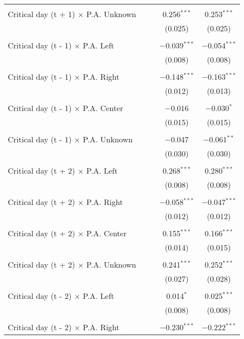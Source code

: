 \documentclass[
]{article}
\begin{document}
\begin{table}[!htbp]
{\begin{tabular}{@{\extracolsep{5pt}}lcccc}
  & & & & \\ 
 Critical day (t + 1) $\times$ P.A. Unknown &  &  & 0.256$^{***}$ & 0.253$^{***}$ \\ 
  &  &  & (0.025) & (0.025) \\ 
  & & & & \\ 
 Critical day (t - 1) $\times$ P.A. Left &  &  & $-$0.039$^{***}$ & $-$0.054$^{***}$ \\ 
  &  &  & (0.008) & (0.008) \\ 
  & & & & \\ 
 Critical day (t - 1) $\times$ P.A. Right &  &  & $-$0.148$^{***}$ & $-$0.163$^{***}$ \\ 
  &  &  & (0.012) & (0.013) \\ 
  & & & & \\ 
 Critical day (t - 1) $\times$ P.A. Center &  &  & $-$0.016 & $-$0.030$^{*}$ \\ 
  &  &  & (0.015) & (0.015) \\ 
  & & & & \\ 
 Critical day (t - 1) $\times$ P.A. Unknown &  &  & $-$0.047 & $-$0.061$^{**}$ \\ 
  &  &  & (0.030) & (0.030) \\ 
  & & & & \\ 
 Critical day (t + 2) $\times$ P.A. Left &  &  & 0.268$^{***}$ & 0.280$^{***}$ \\ 
  &  &  & (0.008) & (0.008) \\ 
  & & & & \\ 
 Critical day (t + 2) $\times$ P.A. Right &  &  & $-$0.058$^{***}$ & $-$0.047$^{***}$ \\ 
  &  &  & (0.012) & (0.012) \\ 
  & & & & \\ 
 Critical day (t + 2) $\times$ P.A. Center &  &  & 0.155$^{***}$ & 0.166$^{***}$ \\ 
  &  &  & (0.014) & (0.015) \\ 
  & & & & \\ 
 Critical day (t + 2) $\times$ P.A. Unknown &  &  & 0.241$^{***}$ & 0.252$^{***}$ \\ 
  &  &  & (0.027) & (0.028) \\ 
  & & & & \\ 
 Critical day (t - 2) $\times$ P.A. Left &  &  & 0.014$^{*}$ & 0.025$^{***}$ \\ 
  &  &  & (0.008) & (0.008) \\ 
  & & & & \\ 
 Critical day (t - 2) $\times$ P.A. Right &  &  & $-$0.230$^{***}$ & $-$0.222$^{***}$ \\ 

\end{tabular}}
\end{table}
\end{document}

